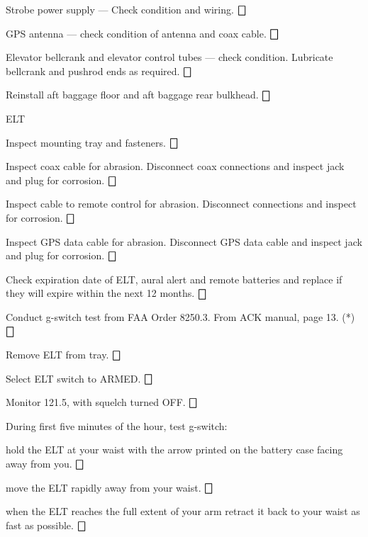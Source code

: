 \begin{enumerate*}
\begin{enumerate*}
		\item Strobe power supply --- Check condition and wiring. \dotfill $\bigbox$
		\item GPS antenna --- check condition of antenna and coax cable. \dotfill $\bigbox$
		\item Elevator bellcrank and elevator control tubes --- check condition. Lubricate bellcrank and pushrod ends as required. \dotfill $\bigbox$
		\item Reinstall aft baggage floor and aft baggage rear bulkhead. \dotfill $\bigbox$
	\end{enumerate*}
  \item{ELT} 
  \begin{enumerate*}
  	\item Inspect mounting tray and fasteners. \dotfill $\bigbox$
  	\item Inspect coax cable for abrasion. Disconnect coax connections and inspect jack and plug for corrosion. \dotfill $\bigbox$
  	\item Inspect cable to remote control for abrasion. Disconnect connections and inspect for corrosion. \dotfill $\bigbox$
  	\item Inspect GPS data cable for abrasion. Disconnect GPS data cable and inspect jack and plug for corrosion. \dotfill $\bigbox$
  	\item Check expiration date of ELT, aural alert and remote batteries and replace if they will expire within the next 12 months. \dotfill $\bigbox$
  	\item Conduct g-switch test from FAA Order 8250.3. From ACK manual, page 13. (*) \dotfill $\bigbox$
  	\begin{enumerate*}
  		\item Remove ELT from tray. \dotfill $\bigbox$
  		\item Select ELT switch to ARMED. \dotfill $\bigbox$
  		\item Monitor 121.5, with squelch turned OFF. \dotfill $\bigbox$
  		\item During first five minutes of the hour, test g-switch: 
  		\begin{enumerate*}
  		  \item hold the ELT at your waist with the arrow printed on the battery case facing away from you. \dotfill $\bigbox$
  		  \item move the ELT rapidly away from your waist. \dotfill $\bigbox$
  		  \item when the ELT reaches the full extent of your arm retract it back to your waist as fast as possible. \dotfill $\bigbox$

\end{enumerate*}
\end{enumerate*}
\end{enumerate*}
\end{enumerate*}
